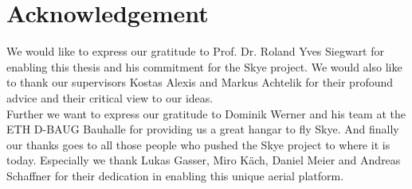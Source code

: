 \section{Acknowledgement}
We would like to express our gratitude to Prof. Dr. Roland Yves Siegwart for enabling this thesis and his commitment for the Skye project.
We would also like to thank our supervisors Kostas Alexis and Markus Achtelik for their profound advice and their critical view to our ideas. \\
Further we want to express our gratitude to Dominik Werner and his team at the ETH D-BAUG Bauhalle for providing us a great hangar to fly Skye.
And finally our thanks goes to all those people who pushed the Skye project to where it is today.
Especially we thank Lukas Gasser, Miro K\"ach, Daniel Meier and Andreas Schaffner for their dedication in enabling this unique aerial platform. 


